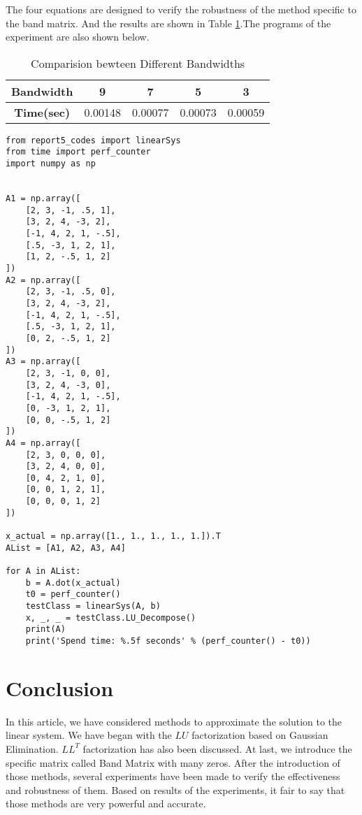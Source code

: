 \documentclass[preprint,12pt]{elsarticle}
\begin{document}
The four equations are designed to verify the robustness of the method specific to the band matrix. And the results are shown in Table \ref{tab:bw}.The programs of the experiment are also shown below.

\begin{table}[h]
  \centering
  \begin{tabular}{c|cccc}
    \textbf{Bandwidth} & 9 & 7 & 5 & 3 \\
    \hline
    \textbf{Time(sec)} & 0.00148 & 0.00077 & 0.00073 & 0.00059
  \end{tabular}
  \caption{Comparision bewteen Different Bandwidths}
  \label{tab:bw}
\end{table}

\begin{lstlisting}
from report5_codes import linearSys
from time import perf_counter
import numpy as np


A1 = np.array([
    [2, 3, -1, .5, 1],
    [3, 2, 4, -3, 2],
    [-1, 4, 2, 1, -.5],
    [.5, -3, 1, 2, 1],
    [1, 2, -.5, 1, 2]
])
A2 = np.array([
    [2, 3, -1, .5, 0],
    [3, 2, 4, -3, 2],
    [-1, 4, 2, 1, -.5],
    [.5, -3, 1, 2, 1],
    [0, 2, -.5, 1, 2]
])
A3 = np.array([
    [2, 3, -1, 0, 0],
    [3, 2, 4, -3, 0],
    [-1, 4, 2, 1, -.5],
    [0, -3, 1, 2, 1],
    [0, 0, -.5, 1, 2]
])
A4 = np.array([
    [2, 3, 0, 0, 0],
    [3, 2, 4, 0, 0],
    [0, 4, 2, 1, 0],
    [0, 0, 1, 2, 1],
    [0, 0, 0, 1, 2]
])

x_actual = np.array([1., 1., 1., 1., 1.]).T
AList = [A1, A2, A3, A4]

for A in AList:
    b = A.dot(x_actual)
    t0 = perf_counter()
    testClass = linearSys(A, b)
    x, _, _ = testClass.LU_Decompose()
    print(A)
    print('Spend time: %.5f seconds' % (perf_counter() - t0))
\end{lstlisting}

\section{Conclusion}
\label{S:4}

In this article, we have considered methods to approximate the solution to the linear system. We have began with the $LU$ factorization based on Gaussian Elimination. $LL^T$ factorization has also been discussed. At last, we introduce the specific matrix called Band Matrix with many zeros. After the introduction of those methods, several experiments have been made to verify the effectiveness and robustness of them. Based on results of the experiments, it fair to say that those methods are very powerful and accurate.
\end{document}
